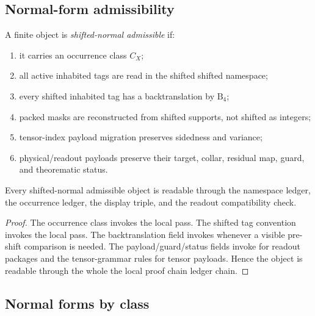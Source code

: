 \subsection{Normal-form admissibility}
\label{subsec:v400-r05-normal-form-admissibility}

\begin{definition}
\label{def:v400-r05-shifted-normal-admissibility}
A finite object is \emph{shifted-normal admissible} if:
\begin{enumerate}[leftmargin=*]
 \item it carries an occurrence class $C_X$;
 \item all active inhabited tags are read in the shifted shifted namespace;
 \item every shifted inhabited tag has a backtranslation by $\mathrm B_4$;
 \item packed masks are reconstructed from shifted supports, not shifted as
 integers;
 \item tensor-index payload migration preserves sidedness and variance;
 \item physical/readout payloads preserve their target, collar, residual map,
 guard, and theorematic status.
\end{enumerate}
\end{definition}

\begin{lemma}
\label{lem:v400-r05-normal-admissibility-implies-ledger-readability}
Every shifted-normal admissible object is readable through the namespace ledger,
the occurrence ledger, the display triple, and the readout
compatibility check.
\end{lemma}

\begin{proof}
The occurrence class invokes the local pass. The shifted tag convention invokes the local pass. The
backtranslation field invokes whenever a visible pre-shift comparison is
needed. The payload/guard/status fields invoke for readout packages and
the tensor-grammar rules for tensor payloads. Hence the object is readable
through the whole the local proof chain ledger chain.
\end{proof}

\subsection{Normal forms by class}
\label{subsec:v400-r05-normal-forms-by-class}

